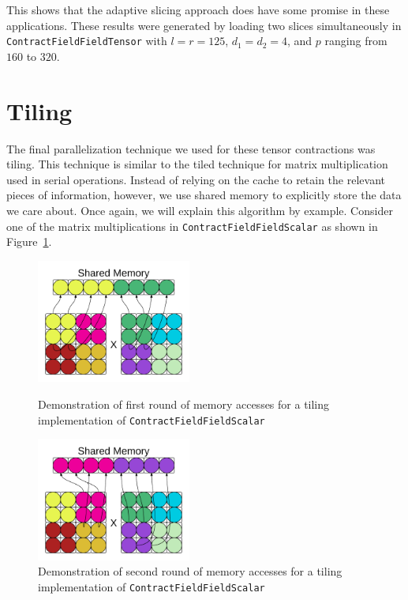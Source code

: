 This shows that the adaptive slicing approach does have some promise in these applications. These results were generated by loading two slices simultaneously in \texttt{ContractFieldFieldTensor} with $l = r = 125$, $d_1 = d_2 = 4$, and $p$ ranging from $160$ to $320$.

\section{Tiling}\label{sec:tiling}

The final parallelization technique we used for these tensor contractions was
tiling. This technique is similar to the tiled technique for matrix
multiplication used in serial operations. Instead of relying on the cache to
retain the relevant pieces of information, however, we use shared memory to
explicitly store the data we care about. Once again, we will explain this
algorithm by example. Consider one of the matrix multiplications in
\texttt{ContractFieldFieldScalar} as shown in Figure~\ref{fig:Tiling}. 


\begin{figure}[!ht]
    \centering
    \includegraphics[width=2in]{SharedMem1.png}
    \caption[Memory accesses -- tiling]{Demonstration of first round of memory
        accesses for a tiling implementation of \texttt{ContractFieldFieldScalar}}
    
    \includegraphics[width=2in]{SharedMem2.png} \caption[Memory accesses --
    tiling]{Demonstration of second round of memory accesses for a tiling
        implementation of \texttt{ContractFieldFieldScalar}}
\label{fig:Tiling}
\end{figure}

